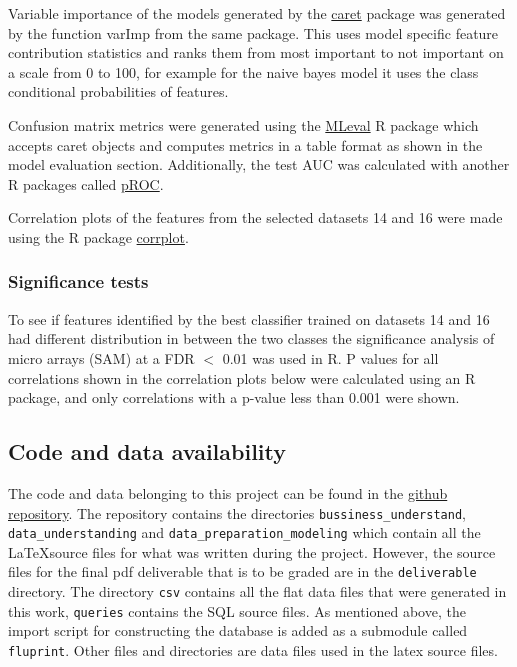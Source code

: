 Variable importance of the models generated by the \href{https://topepo.github.io/caret/}{caret} package was generated by the function varImp from the same package.
This uses model specific feature contribution statistics and ranks them from most important to not important on a scale from 0 to 100, for example for the naive bayes model it uses the class conditional probabilities of features.

Confusion matrix metrics were generated using the \href{https://cran.r-project.org/web/packages/MLeval/index.html}{MLeval} R package which accepts caret objects and computes metrics in a table format as shown in the model evaluation section.
Additionally, the test AUC was calculated with another R packages called \href{https://cran.r-project.org/web/packages/pROC/pROC.pdf}{pROC}.

Correlation plots of the features from the selected datasets 14 and 16 were made using the R package \href{https://cran.r-project.org/web/packages/corrplot/vignettes/corrplot-intro.html}{corrplot}.

\subsubsection{Significance tests}

To see if features identified by the best classifier trained on datasets 14 and 16 had different distribution in between the two classes the significance analysis of micro arrays (SAM) at a FDR \(<\) 0.01 was used in R.
P values for all correlations shown in the correlation plots below were calculated using an R package, and only correlations with a p-value less than 0.001 were shown.

\subsection{Code and data availability}\label{sec:github}

The code and data belonging to this project can be found in the \href{https://github.com/Vinkage/fluprint_exploration}{github repository}.
The repository contains the directories \lstinline{bussiness_understand}, \lstinline{data_understanding} and \lstinline{data_preparation_modeling} which contain all the \LaTeX source files for what was written during the project.
However, the source files for the final pdf deliverable that is to be graded are in the \lstinline{deliverable} directory.
The directory \lstinline{csv} contains all the flat data files that were generated in this work, \lstinline{queries} contains the SQL source files.
As mentioned above, the import script for constructing the database is added as a submodule called \lstinline{fluprint}.
Other files and directories are data files used in the latex source files.

